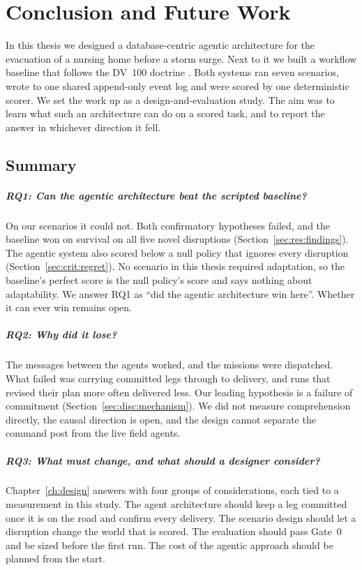 \chapter{Conclusion and Future Work}
\label{ch:conclusion}

In this thesis we designed a database-centric agentic architecture for the
evacuation of a nursing home before a storm surge. Next to it we built a
workflow baseline that follows the DV~100 doctrine \parencite{fwdv100}. Both systems ran seven
scenarios, wrote to one shared append-only event log and were scored by one
deterministic scorer. We set the work up as a design-and-evaluation study.
The aim was to learn what such an architecture can do on a scored task, and to
report the answer in whichever direction it fell.

\section{Summary}
\label{sec:concl:summary}

\paragraph{RQ1: Can the agentic architecture beat the scripted baseline?}
On our scenarios it could not. Both confirmatory hypotheses failed, and the
baseline won on survival on all five novel disruptions
(Section~\ref{sec:res:findings}). The agentic system also scored below a null
policy that ignores every disruption (Section~\ref{sec:crit:regret}). No
scenario in this thesis required
adaptation, so the baseline's perfect score is the null policy's score and
says nothing about adaptability. We answer RQ1 as ``did the agentic
architecture win here''. Whether it can ever win remains open.

\paragraph{RQ2: Why did it lose?}
The messages between the agents worked, and the missions were dispatched.
What failed was carrying committed legs through to delivery, and runs that
revised their plan more often delivered less. Our leading hypothesis is a
failure of commitment (Section~\ref{sec:disc:mechanism}). We did
not measure comprehension directly, the causal direction is open, and the
design cannot separate the command post from the live field agents.

\paragraph{RQ3: What must change, and what should a designer consider?}
Chapter~\ref{ch:design} answers with four groups of considerations, each tied
to a measurement in this study. The agent architecture should keep a leg
committed once it is on the road and confirm every delivery. The scenario
design should let a disruption change the world that is scored. The
evaluation should pass Gate~0 and be sized before the first run. The cost of
the agentic approach should be planned from the start.

